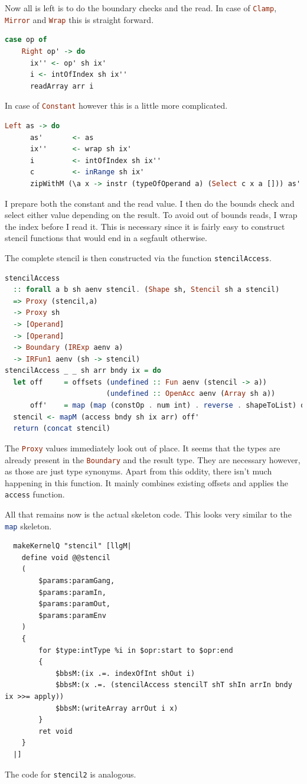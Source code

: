 \documentclass[a4paper,bibliography=totocnumbered,parskip,headsepline]{scrbook}
\begin{document}
Now all is left is to do the boundary checks and the read.
In case of \lstinline[language=haskell]!Clamp!, \lstinline[language=haskell]!Mirror! and \lstinline[language=haskell]!Wrap! this is straight forward.
\begin{lstlisting}[language=haskell]
  case op of
    Right op' -> do
      ix'' <- op' sh ix'
      i <- intOfIndex sh ix''
      readArray arr i
\end{lstlisting}
In case of \lstinline[language=haskell]!Constant! however this is a little more complicated.
\begin{lstlisting}[language=haskell]
    Left as -> do
      as'       <- as
      ix''      <- wrap sh ix'
      i         <- intOfIndex sh ix''
      c         <- inRange sh ix'
      zipWithM (\a x -> instr (typeOfOperand a) (Select c x a [])) as' xs
\end{lstlisting}
I prepare both the constant and the read value.
I then do the bounds check and select either value depending on the result.
To avoid out of bounds reads, I wrap the index before I read it.
This is necessary since it is fairly easy to construct stencil functions that would end in a segfault otherwise.

The complete stencil is then constructed via the function \lstinline[language=haskell]!stencilAccess!.
\begin{lstlisting}[language=haskell]
stencilAccess
  :: forall a b sh aenv stencil. (Shape sh, Stencil sh a stencil)
  => Proxy (stencil,a)
  -> Proxy sh
  -> [Operand]
  -> [Operand]
  -> Boundary (IRExp aenv a)
  -> IRFun1 aenv (sh -> stencil)
stencilAccess _ _ sh arr bndy ix = do
  let off     = offsets (undefined :: Fun aenv (stencil -> a))
                        (undefined :: OpenAcc aenv (Array sh a))
      off'    = map (map (constOp . num int) . reverse . shapeToList) off
  stencil <- mapM (access bndy sh ix arr) off'
  return (concat stencil)
\end{lstlisting}
The \lstinline[language=haskell]!Proxy! values immediately look out of place.
It seems that the types are already present in the \lstinline[language=haskell]!Boundary! and the result type.
They are necessary however, as those are just type synonyms.
Apart from this oddity, there isn't much happening in this function.
It mainly combines existing offsets and applies the \lstinline[language=haskell]!access! function.

All that remains now is the actual skeleton code.
This looks very similar to the \lstinline[language=haskell]!map! skeleton.
\begin{lstlisting}
  makeKernelQ "stencil" [llgM|
    define void @@stencil
    (
        $params:paramGang,
        $params:paramIn,
        $params:paramOut,
        $params:paramEnv
    )
    {
        for $type:intType %i in $opr:start to $opr:end
        {
            $bbsM:(ix .=. indexOfInt shOut i)
            $bbsM:(x .=. (stencilAccess stencilT shT shIn arrIn bndy ix >>= apply))
            $bbsM:(writeArray arrOut i x)
        }
        ret void
    }
  |]
\end{lstlisting}
The code for \lstinline[language=haskell]!stencil2! is analogous.
\end{document}
